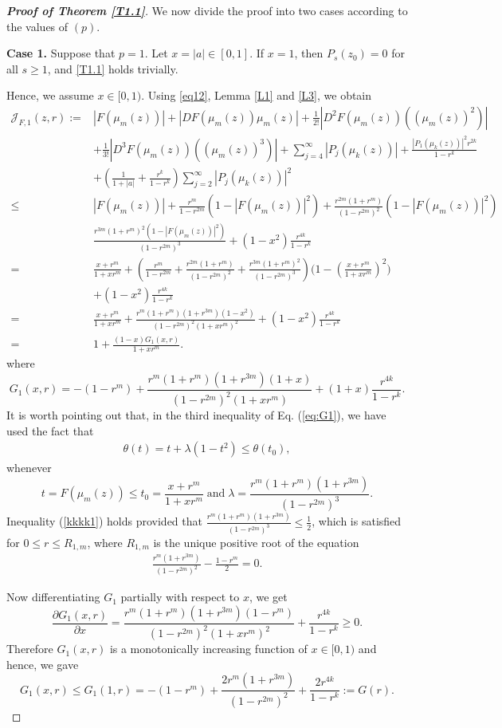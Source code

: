 \documentclass[11pt, reqno]{amsart}
\newtheorem*{cor A}{Corollary A}
\newtheorem*{cor B}{Corollary B}
\newcommand{\bea}{\begin{eqnarray}}
\newcommand{\eea}{\end{eqnarray}}
\numberwithin{equation}{section}
\begin{document}
\begin{proof}[{\bf Proof of Theorem \ref{T1.1}}]
We now divide the proof into two cases according to the values of $(p)$.


{\bf Case 1.} Suppose that  $p=1$.
Let $x=|a|\in[0,1]$. If $x=1$, then $P_s(z_0)=0$ for all $s\ge1$, and
\eqref{T1.1} holds trivially. 

Hence, we assume $x\in[0,1)$. Using  \eqref{eq12}, Lemma \ref{L1} and \ref{L3}, we obtain
\begin{align}
\mathcal{J}_{F,1}(z,r):=&|F(\mu_m(z))|+|D F(\mu_m(z))\mu_m(z)|+\frac{1}{2!}|D^2 F(\mu_m(z)) ((\mu_m(z))^2)|\nonumber\\
&+\frac{1}{3!}|D^3 F(\mu_m(z)) ((\mu_m(z))^3)|+\sum_{j=4}^{\infty} |P_j(\mu_k(z))| +\frac{|P_1(\mu_k(z))|^2r^{2k}}{1-r^k}
\nonumber\\
&+\left(\frac{1}{1+|a|}+\frac{r^k}{1-r^k}\right)
\sum_{j=2}^{\infty} |P_j(\mu_k(z))|^2\nonumber\\ 
\le & |F(\mu_m(z))|+\frac{r^m}{1-r^{2m}}(1-|F(\mu_m(z))|^2)+\frac{r^{2m}(1+r^m)}{(1-r^{2m})^2}(1-|F(\mu_m(z))|^2)\nonumber\\
&\frac{r^{3m}(1+r^m)^2(1-|F(\mu_m(z))|^2)}{(1-r^{2m})^3}+(1-x^2)\frac{r^{4k}}{1-r^k} \nonumber\\
=& \frac{x+r^m}{1+xr^m}+\left(\frac{r^m}{1-r^{2m}}+\frac{r^{2m}(1+r^m)}{(1-r^{2m})^2}+\frac{r^{3m}(1+r^m)^2}{(1-r^{2m})^3}\right)\bigg(1-\left(\frac{x+r^m}{1+xr^m}\right)^2\bigg)\nonumber\\
&+(1-x^2)\frac{r^{4k}}{1-r^k}\nonumber\\
=& \frac{x+r^m}{1+xr^m}+\frac{r^m(1+r^m)(1+r^{3m})(1-x^2)}{(1-r^{2m})^2(1+xr^m)^2}+(1-x^2)\frac{r^{4k}}{1-r^k}\nonumber\\
=&1+\frac{(1-x)G_1(x,r)}{1+xr^m}.\label{eq:G1}
\end{align}
where 
\[
G_1(x,r)=-(1-r^m)+\frac{r^m(1+r^m)(1+r^{3m})(1+x)}{(1-r^{2m})^2(1+xr^m)}+(1+x)\frac{r^{4k}}{1-r^k}.
\]
It is worth pointing out that, in the third inequality of Eq. (\ref{eq:G1}), we have used the fact that 
\bea\label{kkkk1} \theta (t)=t+\lambda (1-t^2)\leq \theta(t_0),\eea
whenever \[t=F(\mu_m(z))\leq t_0=\frac{x+r^m}{1+xr^m} \;\text{and}\; \lambda=\frac{r^m(1+r^m)(1+r^{3m})}{(1-r^{2m})^3}.\]
Inequality (\ref{kkkk1}) holds provided that $\frac{r^m(1+r^m)(1+r^{3m})}{(1-r^{2m})^3}\leq \frac{1}{2}$, which is satisfied for $0\leq r\leq R_{1,m}$, where $R_{1,m}$ is the unique positive root of the equation 
\bea\label{R1m}\frac{r^m(1+r^{3m})}{(1-r^{2m})^2}-\frac{1-r^m}{2}=0.\eea

Now differentiating $G_1$ partially with respect to $x$, we get
\[
\frac{\partial G_1(x,r)}{\partial x}=\frac{r^m(1+r^m)(1+r^{3m})(1-r^m)}{(1-r^{2m})^2(1+xr^m)^2}+\frac{r^{4k}}{1-r^k}\geq 0.
\]
Therefore $G_1(x,r)$ is a monotonically increasing function of $x\in [0,1)$ and hence, we gave 
\[G_1(x,r)\leq G_1(1,r)=-(1-r^m)+\frac{2r^m(1+r^{3m})}{(1-r^{2m})^2}+\frac{2r^{4k}}{1-r^k}:=G(r).\]


\end{proof}
\end{document}
